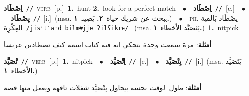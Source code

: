 \documentclass[10pt,a4paper,twoside]{article} %
\begin{document}
\begin{multicols}{2}
{\setlength\topsep{0pt}\textbf{\foreignlanguage{arabic}{اِصْطَاد}}\ {\color{gray}\texttt{//}\color{black}}\ \textsc{verb}\ [p.]\ \textbf{1.}~hunt  \textbf{2.}~look for a perfect match\ \ $\bullet$\ \ \setlength\topsep{0pt}\textbf{\foreignlanguage{arabic}{اِصْطَاد}}\ {\color{gray}\texttt{//}\color{black}}\ [c.]\ \ $\bullet$\ \ \setlength\topsep{0pt}\textbf{\foreignlanguage{arabic}{يِصْطَاد}}\ {\color{gray}\texttt{//}\color{black}}\ [i.]\ \color{gray}(msa. \foreignlanguage{arabic}{يبحث عن شريك حياة}~\foreignlanguage{arabic}{\textbf{٢.}}  \foreignlanguage{arabic}{يَصِيد}~\foreignlanguage{arabic}{\textbf{١.}})\color{black}\ \ $\bullet$\ \ \textsc{ph.} \color{gray} \foreignlanguage{arabic}{يصْطَاد بَالمية العِكْرِة}\color{black}\ {\color{gray}\texttt{/{\sffamily jisˤtˤaːd bilm\#jje ʔilʕikre}/}\color{black}}\ \color{gray} (msa. \foreignlanguage{arabic}{يَتَصَيَّد الأخطاء}~\foreignlanguage{arabic}{\textbf{١.}})\color{black}\ \textbf{1.}~nitpick\  \begin{flushright}\color{gray}\foreignlanguage{arabic}{\textbf{\underline{\foreignlanguage{arabic}{أمثلة}}}: مرة سمعت وحدة بتحكي انه فيه كتاب اسمه كيف تصطادين عريساََ}\end{flushright}\color{black}} \vspace{2mm}

{\setlength\topsep{0pt}\textbf{\foreignlanguage{arabic}{تْصَيَّد}}\ {\color{gray}\texttt{//}\color{black}}\ \textsc{verb}\ [p.]\ \textbf{1.}~nitpick\ \ $\bullet$\ \ \setlength\topsep{0pt}\textbf{\foreignlanguage{arabic}{اِتْصَيَّد}}\ {\color{gray}\texttt{//}\color{black}}\ [c.]\ \ $\bullet$\ \ \setlength\topsep{0pt}\textbf{\foreignlanguage{arabic}{يِتْصَيَّد}}\ {\color{gray}\texttt{//}\color{black}}\ [i.]\ \color{gray}(msa. \foreignlanguage{arabic}{يَتَصَيَّد الأخطاء}~\foreignlanguage{arabic}{\textbf{١.}})\color{black}\  \begin{flushright}\color{gray}\foreignlanguage{arabic}{\textbf{\underline{\foreignlanguage{arabic}{أمثلة}}}: طول الوقت بحسه بيحاول يِتْصَيَّد شغلات تافهة ويعمل منها قصة}\end{flushright}\color{black}} \vspace{2mm}


\end{multicols}
\end{document}
